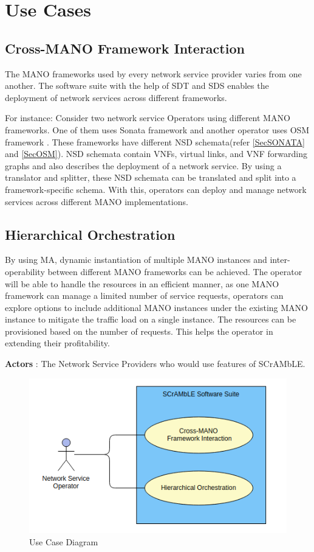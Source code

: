 \section{Use Cases}

\subsection{Cross-MANO Framework Interaction}
The MANO frameworks used by every network service provider varies from one another. The software suite with the help of SDT and SDS enables the deployment of network services across different frameworks.

For instance: Consider two network service Operators using different MANO frameworks. One of them uses Sonata framework \cite{draxler2017sonata} and another operator uses OSM framework \cite{ersue2013etsi}. These frameworks have different NSD schemata(refer \ref{SecSONATA} and \ref{SecOSM}). NSD schemata contain VNFs, virtual links, and VNF forwarding graphs and also describes the deployment of a network service. By using a translator and splitter, these NSD schemata can be translated and split into a framework-specific schema. With this, operators can deploy and manage network services across different MANO implementations.

\subsection{Hierarchical Orchestration}
By using MA, dynamic instantiation of multiple MANO instances and inter-operability between different MANO frameworks can be achieved. The operator will be able to handle the resources in an efficient manner, as one MANO framework can manage a limited number of service requests, operators can explore options to include additional MANO instances under the existing MANO instance to mitigate the traffic load on a single instance. The resources can be provisioned based on the number of requests. This helps the operator in extending their profitability.

\textbf{Actors} : The Network Service Providers who would use features of SCrAMbLE.

\begin{figure} [h]
	\centering
	\includegraphics[width=0.9\linewidth]{figures/use-case}
	\caption{Use Case Diagram}
	\label{fig:use-case}
\end{figure}





